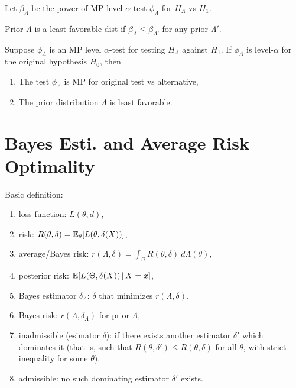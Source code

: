 Let $\beta_\Lambda$ be the power of MP level-$\alpha$ test $\phi_\Lambda$ for $H_\Lambda$ vs $H_1$.

Prior $\Lambda$ is a least favorable dist if $\beta_\Lambda \leq \beta_{\Lambda'}$ for any prior $\Lambda'$.

Suppose $\phi_\Lambda$ is an MP level $\alpha$-test for testing $H_\Lambda$ against $H_1$. If $\phi_\Lambda$ is level-$\alpha$ for the original hypothesis $H_0$, then \begin{enumerate}[
        leftmargin = 2em,
    ]
    \item The test $\phi_\Lambda$ is MP for original test vs alternative,
    \item The prior distribution $\Lambda$ is least favorable.
\end{enumerate}




\newpage







\section*{Bayes Esti. and Average Risk Optimality}


Basic definition: 
    \begin{enumerate}[
        leftmargin = 2em,
    ]
    \item loss function: $L(\theta, d)$,
    \item risk: $R(\theta, \delta) = \mathbb{E}_\theta [L(\theta, \delta(X))]$,
    \item average/Bayes risk: $r(\Lambda, \delta) = \int_\Omega R(\theta, \delta)\ d\Lambda(\theta)$,
    \item posterior risk: $\mathbb{E} [L(\Theta, \delta(X)) \, | \, X=x]$,
    \item Bayes estimator $\delta_\Lambda$: $\delta$ that minimizes $r(\Lambda, \delta)$,
    \item Bayes risk: $r(\Lambda, \delta_{\Lambda})$ for prior $\Lambda$,
    \item inadmissible (esimator $\delta$): if there exists another estimator $\delta'$ which dominates it (that is, such that $R(\theta, \delta')\leq R(\theta, \delta)$ for all $\theta$, with strict inequality for some $\theta$),
    \item admissible: no such dominating estimator $\delta'$ exists. 
\end{enumerate}

